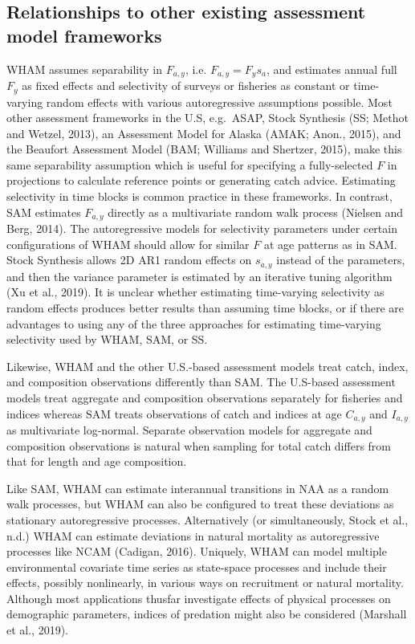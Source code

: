 \documentclass[]{article}
\begin{document}
\hypertarget{relationships-to-other-existing-assessment-model-frameworks}{%
\subsection{Relationships to other existing assessment model
frameworks}\label{relationships-to-other-existing-assessment-model-frameworks}}

WHAM assumes separability in \(F_{a,y}\), i.e. \(F_{a,y} = F_y s_a\),
and estimates annual full \(F_y\) as fixed effects and selectivity of
surveys or fisheries as constant or time-varying random effects with
various autoregressive assumptions possible. Most other assessment
frameworks in the U.S, e.g.~ASAP, Stock Synthesis (SS; Methot and
Wetzel, 2013), an Assessment Model for Alaska (AMAK; Anon., 2015), and
the Beaufort Assessment Model (BAM; Williams and Shertzer, 2015), make
this same separability assumption which is useful for specifying a
fully-selected \(F\) in projections to calculate reference points or
generating catch advice. Estimating selectivity in time blocks is common
practice in these frameworks. In contrast, SAM estimates \(F_{a,y}\)
directly as a multivariate random walk process (Nielsen and Berg, 2014).
The autoregressive models for selectivity parameters under certain
configurations of WHAM should allow for similar \(F\) at age patterns as
in SAM. Stock Synthesis allows 2D AR1 random effects on \(s_{a,y}\)
instead of the parameters, and then the variance parameter is estimated
by an iterative tuning algorithm (Xu et al., 2019). It is unclear
whether estimating time-varying selectivity as random effects produces
better results than assuming time blocks, or if there are advantages to
using any of the three approaches for estimating time-varying
selectivity used by WHAM, SAM, or SS.

Likewise, WHAM and the other U.S.-based assessment models treat catch,
index, and composition observations differently than SAM. The U.S-based
assessment models treat aggregate and composition observations
separately for fisheries and indices whereas SAM treats observations of
catch and indices at age \(C_{a,y}\) and \(I_{a,y}\) as multivariate
log-normal. Separate observation models for aggregate and composition
observations is natural when sampling for total catch differs from that
for length and age composition.

Like SAM, WHAM can estimate interannual transitions in NAA as a random
walk processes, but WHAM can also be configured to treat these
deviations as stationary autoregressive processes. Alternatively (or
simultaneously, Stock et al., n.d.) WHAM can estimate deviations in
natural mortality as autoregressive processes like NCAM (Cadigan, 2016).
Uniquely, WHAM can model multiple environmental covariate time series as
state-space processes and include their effects, possibly nonlinearly,
in various ways on recruitment or natural mortality. Although most
applications thusfar investigate effects of physical processes on
demographic parameters, indices of predation might also be considered
(Marshall et al., 2019).
\end{document}
